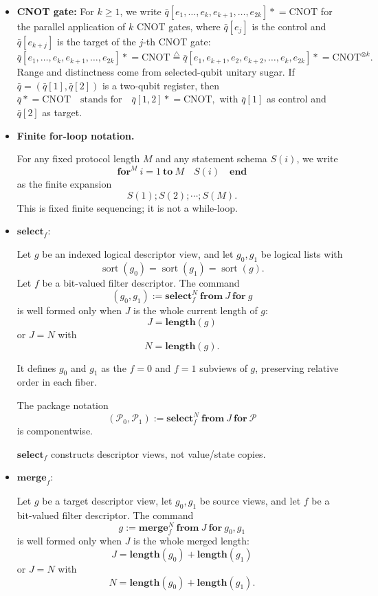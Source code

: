 \documentclass[acmsmall,screen,review,anonymous,nonacm]{acmart}
\theoremstyle{defn_style}
\newcommand{\asteq}{\mathrel{*}=}
\begin{document}
\begin{itemize}
    \item \textbf{CNOT gate:}
    For \(k\ge 1\), we write
    \(\bar q[e_1,\ldots,e_k,e_{k+1},\ldots,e_{2k}]\asteq \mathrm{CNOT}\)
    for the parallel application of \(k\) CNOT gates, where \(\bar q[e_j]\)
    is the control and \(\bar q[e_{k+j}]\) is the target of the \(j\)-th CNOT
    gate:
    \[
    \bar q[e_1,\ldots,e_k,e_{k+1},\ldots,e_{2k}]\asteq \mathrm{CNOT}
    \stackrel{\triangle}{=}
    \bar q[e_1,e_{k+1},e_2,e_{k+2},\ldots,e_k,e_{2k}]
    \asteq \mathrm{CNOT}^{\otimes k}.
    \]
    Range and distinctness come from selected-qubit unitary sugar. If
    \(\bar q=(\bar q[1],\bar q[2])\) is a two-qubit register, then
    \(\bar q\asteq \mathrm{CNOT}
    \quad\text{stands for}\quad
    \bar q[1,2]\asteq \mathrm{CNOT},\)
    with \(\bar q[1]\) as control and \(\bar q[2]\) as target.

    \item \textbf{Finite for-loop notation.}

    For any fixed protocol length \(M\) and any statement schema \(S(i)\), we
    write
    \[
    \mathbf{for}^{M}\ i=1\ \mathbf{to}\ M
    \quad S(i)
    \quad \mathbf{end}
    \]
    as the finite expansion
    \[
    S(1);S(2);\cdots;S(M).
    \]
    This is fixed finite sequencing; it is not a while-loop.

\item \(\mathbf{select}_{f}\):

Let \(g\) be an indexed logical descriptor view, and let \(g_0,g_1\) be
logical lists with
\[
\operatorname{sort}(g_0)=\operatorname{sort}(g_1)=\operatorname{sort}(g).
\]
Let \(f\) be a bit-valued filter descriptor. The command
\[
(g_0,g_1)
:=
\mathbf{select}_{f}^{N}\ \mathbf{from}\ J\ \mathbf{for}\ g
\]
is well formed only when \(J\) is the whole current length of \(g\):
\[
J=\mathbf{length}(g)
\]
or \(J=N\) with
\[
N=\mathbf{length}(g).
\]

It defines \(g_0\) and \(g_1\) as the \(f=0\) and \(f=1\) subviews of \(g\),
preserving relative order in each fiber.

The package notation
\[
(\mathcal P_0,\mathcal P_1)
:=
\mathbf{select}_{f}^{N}\ \mathbf{from}\ J\ \mathbf{for}\ \mathcal P
\]
is componentwise.

\(\mathbf{select}_{f}\) constructs descriptor views, not value/state copies.

\item \(\mathbf{merge}_{f}\):

Let \(g\) be a target descriptor view, let \(g_0,g_1\) be source views, and let
\(f\) be a bit-valued filter descriptor. The command
\[
g
:=
\mathbf{merge}_{f}^{N}\ \mathbf{from}\ J\ \mathbf{for}\ g_0,g_1
\]
is well formed only when \(J\) is the whole merged length:
\[
J=\mathbf{length}(g_0)+\mathbf{length}(g_1)
\]
or \(J=N\) with
\[
N=\mathbf{length}(g_0)+\mathbf{length}(g_1).
\]


\end{itemize}
\end{document}
